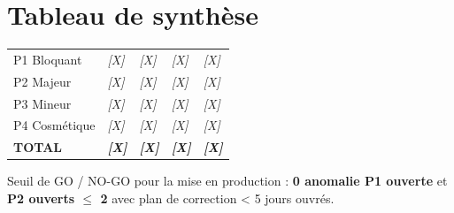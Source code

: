 \documentclass[11pt,a4paper,oneside]{report}
\begin{document}
\section*{Tableau de synthèse}

\renewcommand{\arraystretch}{1.3}
\begin{tabularx}{\textwidth}{L{3cm} C{2cm} C{2cm} C{2cm} C{2cm}}
\toprule
{} &  &  &  &  \\
\midrule
P1 Bloquant   & \textit{[X]} & \textit{[X]} & \textit{[X]} & \textit{[X]} \\
P2 Majeur     & \textit{[X]} & \textit{[X]} & \textit{[X]} & \textit{[X]} \\
P3 Mineur     & \textit{[X]} & \textit{[X]} & \textit{[X]} & \textit{[X]} \\
P4 Cosmétique & \textit{[X]} & \textit{[X]} & \textit{[X]} & \textit{[X]} \\
\midrule
{}\textbf{TOTAL} & \textbf{\textit{[X]}} & \textbf{\textit{[X]}} & \textbf{\textit{[X]}} & \textbf{\textit{[X]}} \\
\bottomrule
\end{tabularx}

\begin{alert}
Seuil de GO / NO-GO pour la mise en production : \textbf{0 anomalie P1 ouverte} et \textbf{P2 ouverts $\leq$ 2} avec plan de correction \textless{} 5 jours ouvrés.
\end{alert}
\end{document}
